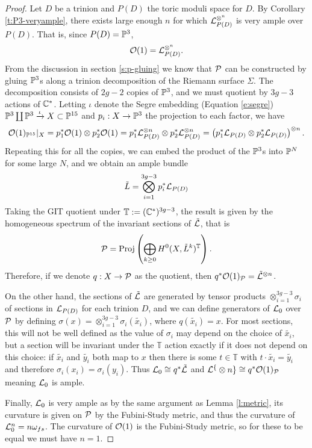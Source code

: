 \begin{proof}
	Let $D$ be a trinion and $P(D)$ the toric moduli space for $D$. By Corollary \ref{t:P3-veryample}, there exists large enough $n$ for which $\mathcal{L}_{P(D)}^{\otimes^n}$ is very ample over $P(D)$. That is, since $P(D) = \mathbb{P}^3$,
	\begin{equation}
	\mathcal{O}(1) = \mathcal{L}_{P(D)}^{\otimes^n}.
	\end{equation}
	From the discussion in section \ref{s:p-gluing} we know that $\mathcal{P}$ can be constructed by gluing $\mathbb{P}^3$s along a trinion decomposition of the Riemann surface $\Sigma$. The decomposition consists of $2g-2$ copies of $\mathbb{P}^3$, and we must quotient by $3g-3$ actions of $\mathbb{C}^\ast$. Letting $\iota$ denote the Segre embedding (Equation \ref{e:segre}) $\mathbb{P}^3 \coprod \mathbb{P}^3 \xrightarrow{\iota} X\subset \mathbb{P}^{15}$ and $p_i:X\to \mathbb{P}^3$ the projection to each factor, we have
	\begin{equation}
	\mathcal{O}(1)_{\mathbb{P}^{15}}|_X = p_1^\ast \mathcal{O}(1)\otimes p_2^\ast \mathcal{O}(1) = p_1^\ast \mathcal{L}_{P(D)}^{\otimes n}\otimes p_2^\ast \mathcal{L}_{P(D)}^{\otimes n} = \left(p_1^\ast \mathcal{L}_{P(D)}\otimes p_2^\ast \mathcal{L}_{P(D)}\right)^{\otimes n}.
	\end{equation}
	Repeating this for all the copies, we can embed the product of the $\mathbb{P}^3$s into $\mathbb{P}^N$ for some large $N$, and we obtain an ample bundle 
	\begin{equation}
		\tilde{L} = \bigotimes_{i=1}^{3g-3} p_i^\ast \mathcal{L}_{P(D)}
	\end{equation}
	Taking the GIT quotient under $\mathbb{T}:=(\mathbb{C}^\ast)^{3g-3}$, the result is given by the homogeneous spectrum of the invariant sections of $\tilde{\mathcal{L}}$, that is
	\begin{equation}
		\mathcal{P} = \text{Proj}\left(
		\bigoplus_{k\geq 0} H^0(X,\tilde{L}^k)^\mathbb{T}
		\right).
	\end{equation}
	Therefore, if we denote $q:X\to \mathcal{P}$ as the quotient, then $q^\ast \mathcal{O}(1)_{\mathcal{P}} = \tilde{\mathcal{L}}^{\otimes n}$. 
	
	On the other hand, the sections of $\tilde{\mathcal{L}}$ are generated by tensor products  $\otimes_{i=1}^{3g-3}\sigma_i$ of sections in $\mathcal{L}_{P(D)}$ for each trinion $D$, and we can define generators of $\mathcal{L}_0$ over $\mathcal{P}$ by defining $\sigma(x) = \otimes_{i=1}^{3g-3}\sigma_i(\tilde{x_i})$, where $q(\tilde{x_i}) = x$. For most sections, this will not be well defined as the value of $\sigma_i$ may depend on the choice of $\tilde{x_i}$,  but a section will be invariant under the $\mathbb{T}$ action exactly if it does not depend on this choice: if $\tilde{x_i}$ and $\tilde{y_i}$ both map to $x$ then there is some $t\in \mathbb{T}$ with $t\cdot\tilde{x_i} = \tilde{y_i}$ and therefore $\sigma_i(x_i) = \sigma_i(y_i)$. Thus $\mathcal{L}_0 \cong q^\ast\tilde{\mathcal{L}}$ and $\mathcal{L}^\{\otimes n\} \cong q^\ast \mathcal{O}(1)_{\mathcal{P}}$ meaning $\mathcal{L}_0$ is ample.
	
	Finally, $\mathcal{L}_0$ is very ample as by the same argument as Lemma \ref{l:metric}, its curvature is given on $\mathcal{P}$ by the Fubini-Study metric, and thus the curvature of $\mathcal{L}_0^n = n\omega_{fs}$. The curvature of $\mathcal{O}(1)$ is the Fubini-Study metric, so for these to be equal we must have $n=1$.
\end{proof}
